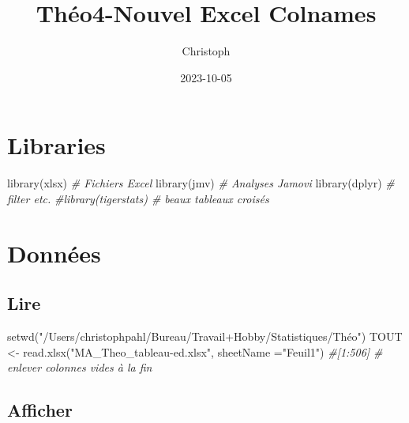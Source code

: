 \documentclass[
]{article}
\title{Théo4-Nouvel Excel Colnames}
\author{Christoph}
\date{2023-10-05}
\newenvironment{Shaded}{\begin{snugshade}}{\end{snugshade}}
\newcommand{\AttributeTok}[1]{\textcolor[rgb]{0.77,0.63,0.00}{#1}}
\newcommand{\CommentTok}[1]{\textcolor[rgb]{0.56,0.35,0.01}{\textit{#1}}}
\newcommand{\FunctionTok}[1]{\textcolor[rgb]{0.00,0.00,0.00}{#1}}
\newcommand{\NormalTok}[1]{#1}
\newcommand{\OtherTok}[1]{\textcolor[rgb]{0.56,0.35,0.01}{#1}}
\newcommand{\StringTok}[1]{\textcolor[rgb]{0.31,0.60,0.02}{#1}}
\begin{document}
\maketitle

\hypertarget{libraries}{%
\section{Libraries}\label{libraries}}

\begin{Shaded}
\begin{Highlighting}[]
\FunctionTok{library}\NormalTok{(xlsx)                                         }\CommentTok{\# Fichiers Excel}
\FunctionTok{library}\NormalTok{(jmv)                                          }\CommentTok{\# Analyses Jamovi}
\FunctionTok{library}\NormalTok{(dplyr)                                        }\CommentTok{\# filter etc.}
\CommentTok{\#library(tigerstats)                                   \# beaux tableaux croisés}
\end{Highlighting}
\end{Shaded}

\hypertarget{donnuxe9es}{%
\section{Données}\label{donnuxe9es}}

\hypertarget{lire}{%
\subsection{Lire}\label{lire}}

\begin{Shaded}
\begin{Highlighting}[]
\FunctionTok{setwd}\NormalTok{(}\StringTok{"/Users/christophpahl/Bureau/Travail+Hobby/Statistiques/Théo"}\NormalTok{)}
\NormalTok{TOUT }\OtherTok{\textless{}{-}} \FunctionTok{read.xlsx}\NormalTok{(}\StringTok{"MA\_Theo\_tableau{-}ed.xlsx"}\NormalTok{, }\AttributeTok{sheetName =}\StringTok{"Feuil1"}\NormalTok{) }\CommentTok{\#[1:506]  \# enlever colonnes vides à la fin}
\end{Highlighting}
\end{Shaded}

\hypertarget{afficher}{%
\subsection{Afficher}\label{afficher}}
\end{document}
